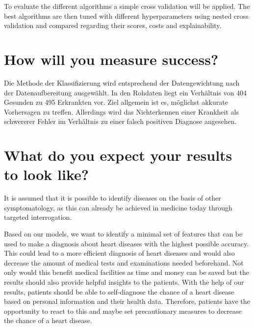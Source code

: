 \documentclass[11pt,titlepage,oneside,openany]{book}
\begin{document}
To evaluate the different algorithms a simple cross validation will be applied. The best algorithms are then tuned with different hyperparameters using nested cross validation and compared regarding their scores, costs and explainability. 

\section{How will you measure success?}
\label{sec:success}

Die Methode der Klassifizierung wird entsprechend der Datengewichtung nach der Datenaufbereitung ausgewählt. In den Rohdaten liegt ein Verhältnis von 404 Gesunden zu 495 Erkrankten vor. Ziel allgemein ist es, möglichst akkurate Vorhersagen zu treffen. Allerdings wird das Nichterkennen einer Krankheit als schwererer Fehler im Verhältnis zu einer falsch positiven Diagnose angesehen. 

\section{What do you expect your results to look like?}
\label{sec:results}

It is assumed that it is possible to identify diseases on the basis of other symptomatology, as this can already be achieved in medicine today through targeted interrogation. 

Based on our models, we want to identify a minimal set of features that can be used to make a diagnosis about heart diseases with the highest possible accuracy. This could lead to a more efficient diagnosis of heart diseases and would also decrease the amount of medical tests and examinations needed beforehand. 
Not only would this benefit medical facilities as time and money can be saved but the results should also provide helpful insights to the patients. With the help of our results, patients should be able to self-diagnose the chance of a heart disease based on personal information and their health data. Therefore, patients have the opportunity to react to this and maybe set precautionary measures to decrease the chance of a heart disease.







\newpage


\pagestyle{empty}
\end{document}
